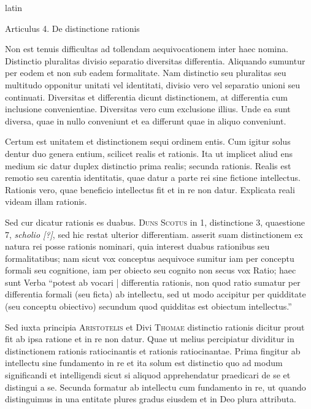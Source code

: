 \begin{otherlanguage*}{latin}
        \pstart
        \pend
      
\pstart
\noindent%
 Articulus 4. De distinctione rationis 
\pend

\pstart
 Non est tenuis difficultas ad tollendam aequivocationem inter haec nomina. Distinctio pluralitas divisio separatio diversitas differentia. Aliquando sumuntur per eodem et non sub eadem formalitate. Nam distinctio seu pluralitas seu multitudo opponitur unitati vel identitati, divisio vero vel separatio unioni seu continuati. Diversitas et differentia dicunt distinctionem, at differentia cum inclusione convenientiae. Diversitas vero cum exclusione illius. Unde ea sunt diversa, quae in nullo conveniunt et ea differunt quae in aliquo conveniunt. 
\pend

\pstart
 Certum est unitatem et distinctionem sequi ordinem entis. Cum igitur solus dentur duo genera entium, scilicet realis et rationis. Ita ut implicet aliud ens medium sic datur duplex distinctio prima realis; secunda rationis. Realis est remotio seu carentia identitatis, quae datur a parte rei sine fictione intellectus. Rationis vero, quae beneficio intellectus fit et in re non datur. Explicata reali videam illam rationis. 
\pend

\pstart
 Sed cur dicatur rationis es duabus. \textsc{Duns Scotus} in 1, distinctione 3, quaestione 7, \emph{scholio [?]}, sed hic restat ulterior differentiam. asserit suam distinctionem ex natura rei posse rationis nominari, quia interest duabus rationibus seu formalitatibus; nam sicut vox conceptus aequivoce sumitur iam per conceptu formali seu cognitione, iam per obiecto seu cognito non secus vox Ratio; haec sunt Verba \enquote{potest ab vocari \textnormal{|}  differentia rationis, non quod ratio sumatur per differentia formali (seu ficta) ab intellectu, sed ut modo accipitur per quidditate (seu conceptu obiectivo) secundum quod quidditas est obiectum intellectus.} 
\pend

\pstart
 Sed iuxta principia \textsc{Aristotelis} et Divi \textsc{Thomae} distinctio rationis dicitur prout fit ab ipsa ratione et in re non datur. Quae ut melius percipiatur dividitur in distinctionem rationis ratiocinantis et rationis ratiocinantae. Prima fingitur ab intellectu sine fundamento in re et ita solum est distinctio quo ad modum significandi et intelligendi sicut si aliquod apprehendatur praedicari de se et distingui a se. Secunda formatur ab intellectu cum fundamento in re, ut quando distinguimus in una entitate plures gradus eiusdem et in Deo plura attributa. 
\pend


\end{otherlanguage*}
